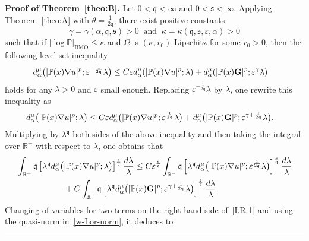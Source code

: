 \documentclass[a4paper, 11pt]{article}
\newenvironment{proof}[1][Proof]{\textbf{#1.} }{\hfill\rule{0.5em}{0.5em}}
\begin{document}
\begin{proof}[Proof of Theorem~\ref{theo:B}]
Let $0<\mathfrak{q}<\infty$ and $0<\mathfrak{s}<\infty$. Applying Theorem~\ref{theo:A} with $\theta = \frac{1}{2\mathfrak{q}}$, there exist positive constants 
$$\gamma = \gamma(\alpha,\mathfrak{q},\mathfrak{s})>0 \ \mbox{ and } \ \kappa = \kappa(\mathfrak{q},\mathfrak{s},\varepsilon,\alpha)>0$$ 
such that if $|\log \mathbb{P}|_{\mathrm{BMO}} \le \kappa$ and $\Omega$ is $(\kappa,r_0)$-Lipschitz for some $r_0>0$, then the following level-set inequality
\begin{align}\notag
 & d^{\mu}_{\alpha}\big(|\mathbb{P}(x)\nabla u|^{p};\varepsilon^{-\frac{1}{2\mathfrak{q}}}\lambda\big) \le C \varepsilon d^{\mu}_{\alpha}(|\mathbb{P}(x)\nabla u|^{p};\lambda) + d^{\mu}_{\alpha}(|\mathbb{P}(x)\mathbf{G}|^{p};\varepsilon^{\gamma}\lambda)
\end{align}
holds for any $\lambda> 0$ and $\varepsilon$ small enough. Replacing $\varepsilon^{-\frac{1}{2\mathfrak{q}}}\lambda$ by $\lambda$, one rewrite this inequality as 
\begin{align}\notag
 & d^{\mu}_{\alpha}\big(|\mathbb{P}(x)\nabla u|^{p};\lambda\big) \le C \varepsilon d^{\mu}_{\alpha}\big(|\mathbb{P}(x)\nabla u|^{p};\varepsilon^{\frac{1}{2\mathfrak{q}}}\lambda\big) + d^{\mu}_{\alpha}\big(|\mathbb{P}(x)\mathbf{G}|^{p};\varepsilon^{\gamma+\frac{1}{2\mathfrak{q}}}\lambda\big).
\end{align}
Multiplying by $\lambda^{\mathfrak{q}}$ both sides of the above inequality and then taking the integral over $\mathbb{R}^+$ with respect to $\lambda$, one obtains that
\begin{align}\notag
 & \int_{\mathbb{R}^+} \mathfrak{q}\left[\lambda^{\mathfrak{q}} d^{\mu}_{\alpha}\big(|\mathbb{P}(x)\nabla u|^{p};\lambda\big) \right]^{\frac{\mathfrak{s}}{\mathfrak{q}}} \frac{d\lambda}{\lambda}  \le C \varepsilon^{\frac{\mathfrak{s}}{\mathfrak{q}}}  \int_{\mathbb{R}^+}\mathfrak{q} \left[\lambda^{\mathfrak{q}} d^{\mu}_{\alpha}\big(|\mathbb{P}(x)\nabla u|^{p};\varepsilon^{\frac{1}{2\mathfrak{q}}}\lambda\big)\right]^{\frac{\mathfrak{s}}{\mathfrak{q}}} \frac{d\lambda}{\lambda} \\
 & \hspace{2cm} + C \int_{\mathbb{R}^+} \mathfrak{q}\left[\lambda^{\mathfrak{q}} d^{\mu}_{\alpha}\big(|\mathbb{P}(x)\mathbf{G}|^{p};\varepsilon^{\gamma+\frac{1}{2\mathfrak{q}}}\lambda\big)\right]^{\frac{\mathfrak{s}}{\mathfrak{q}}} \frac{d\lambda}{\lambda}.\label{LR-1}
\end{align}
Changing of variables for two terms on the right-hand side of~\eqref{LR-1} and using the quasi-norm in~\eqref{w-Lor-norm}, it deduces to 

\end{proof}
\end{document}
